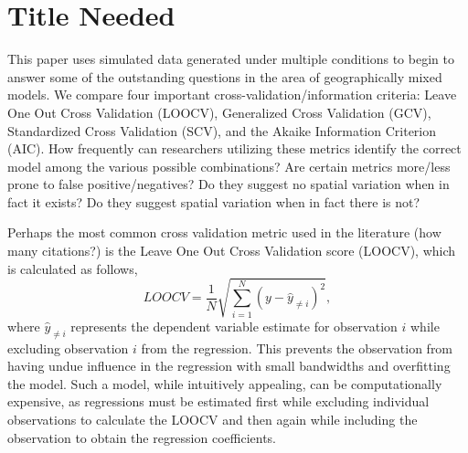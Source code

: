 \documentclass{article}\usepackage[]{graphicx}\usepackage[]{color}
\begin{document}
\section{Title Needed}

This paper uses simulated data generated under multiple conditions to begin to answer some of the outstanding questions in the area of geographically mixed models. We compare four important cross-validation/information criteria: Leave One Out Cross Validation (LOOCV), Generalized Cross Validation (GCV), Standardized Cross Validation (SCV), and the Akaike Information Criterion (AIC). How frequently can researchers utilizing these metrics identify the correct model among the various possible combinations? Are certain metrics more/less prone to false positive/negatives? Do they suggest no spatial variation when in fact it exists? Do they suggest spatial variation when in fact there is not? 

Perhaps the most common cross validation metric used in the literature (how many citations?) is the Leave One Out Cross Validation score (LOOCV), which is calculated as follows,
\begin{equation}\label{eq:LOOCV}
LOOCV = \frac{1}{N} \sqrt{\sum _{i = 1}^{N} (y - \hat{y}_{\neq i})^2},  
\end{equation}
where $\hat{y}_{\neq i}$ represents the dependent variable estimate for observation $i$ while excluding observation $i$ from the regression. This prevents the observation from having undue influence in the regression with small bandwidths and overfitting the model. Such a model, while intuitively appealing, can be computationally expensive, as regressions must be estimated first while excluding individual observations to calculate the LOOCV and then again while including the observation to obtain the regression coefficients.
\end{document}
